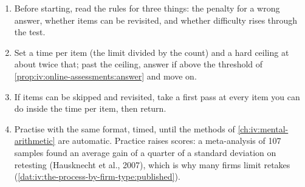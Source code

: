 \begin{omfigure}

\label{fig:iv:online-assessments:skip}
\end{omfigure}

\begin{method}\label{met:iv:online-assessments:timed}
\begin{enumerate}
\item Before starting, read the rules for three things: the penalty for a wrong answer, whether items can be
revisited, and whether difficulty rises through the test.
\item Set a time per item (the limit divided by the count) and a hard ceiling at about twice that; past the
ceiling, answer if above the threshold of \cref{prop:iv:online-assessments:answer} and move on.
\item If items can be skipped and revisited, take a first pass at every item you can do inside the time per
item, then return.
\item Practise with the same format, timed, until the methods of \cref{ch:iv:mental-arithmetic} are automatic.
Practice raises scores: a meta-analysis of 107 samples found an average gain of a quarter of a standard
deviation on retesting (Hausknecht et al., 2007), which is why many firms limit retakes
(\cref{dat:iv:the-process-by-firm-type:published}).
\end{enumerate}
\end{method}

